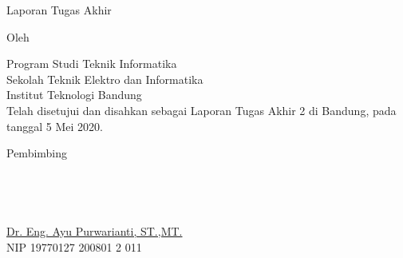 \clearpage
\pagestyle{empty}

\begin{center}
\smallskip

    \Large \bfseries \MakeUppercase{\thetitle}
    \vfill

    \Large Laporan Tugas Akhir
    \vfill

    \large Oleh

    \Large \theauthor

    \large Program Studi Teknik Informatika \\
    Sekolah Teknik Elektro dan Informatika \\
    Institut Teknologi Bandung \\

    \vfill
    \normalsize \normalfont
    Telah disetujui dan disahkan sebagai Laporan Tugas Akhir 2 di Bandung, pada tanggal 5 Mei 2020.

    \vfill
    \normalsize \normalfont
    Pembimbing\\
    ~\\
    ~\\
    ~\\
    ~\\
    \underline{Dr. Eng. Ayu Purwarianti, ST.,MT.} \\
    NIP 19770127 200801 2 011


\end{center}
\clearpage
